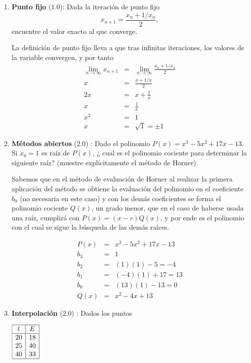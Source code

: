\documentclass[12pt]{article}
\begin{document}
  \begin{enumerate}[leftmargin=*,widest=9]
    \item \textbf{Punto fijo} ($1.0$): Dada la iteración de punto fijo \[ x_{n+1} = \frac{x_n + 1/x_n}{2},\] encuentre el valor exacto al que converge.
    
    La definición de punto fijo lleva a que tras infinitas iteraciones, los valores de la variable convergen, y por tanto
    \begin{eqnarray*}
    \lim_{n \rightarrow \infty} x_{n+1} & = & \lim_{n \rightarrow \infty} \frac{x_n + 1/x_n}{2} \\
    x & = & \frac{x + 1/x}{2} \\
    2x & = & x + \frac{1}{x}\\
    x & = & \frac{1}{x}\\
    x^2 & = & 1\\
    x & = & \sqrt{1} = \pm 1
    \end{eqnarray*}


    \item \textbf{Métodos abiertos} ($2.0$) : Dado el polinomio \(P(x) = x^3 - 5x^2 + 17x -13\). Si \(x_0 = 1\) es raíz de \(P(x)\), ¿ cual es el polinomio cociente para determinar la siguiente raíz? (muestre explícitamente el método de Horner).
    
    Sabemos que en el método de evaluación de Horner al realizar la primera aplicación del método se obtiene la evaluación del polinomio en el coeficiente \(b_0\) (no necesaria en este caso) y con los demás coeficientes se forma el polinomio cociente \(Q(x)\), un grado menor, que en el caso de haberse usada una raíz, cumplirá con \(P(x) = (x-r)Q(x) \), y por ende es el polinomio con el cual se sigue la búsqueda de las demás raíces.

\begin{eqnarray*}
P(x) & = & x^3 - 5x^2 + 17x -13\\
b_3 & = & 1 \\
b_2 & = & (1)(1) - 5 = -4\\
b_1 & = & (-4)(1) + 17 = 13\\
b_0 & = & (13)(1) - 13 = 0 \\
Q(x) & = & x^2 - 4x + 13
\end{eqnarray*}
   
    \item \textbf{Interpolación} ($2.0$) : Dados los puntos
    \begin{center}
        \(
    \begin{array}{|c|c|}
    \hline
    t & E \\
    \hline
    20 & 18 \\
    25 & 40\\
    40 & 33\\
    \hline
    \end{array}
    \)
    \end{center}


\end{enumerate}
\end{document}

